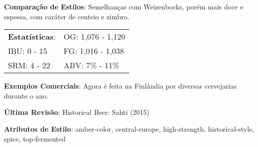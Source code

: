 \textbf{Comparação de Estilos}: Semelhanças com Weizenbocks, porém mais doce e espessa, com caráter de centeio e zimbro.

\begin{tabular}{@{}p{35mm}p{35mm}@{}}
  \textbf{Estatísticas}: & OG: 1,076 - 1,120 \\
  IBU: 0 - 15  & FG: 1,016 - 1,038  \\
  SRM: 4 - 22 & ABV: 7\% - 11\%
\end{tabular}

\textbf{Exemplos Comerciais}: Agora é feita na Finlândia por diversas cervejarias durante o ano.

\textbf{Última Revisão}: Historical Beer: Sahti (2015)

\textbf{Atributos de Estilo}: amber-color, central-europe, high-strength, historical-style, spice, top-fermented